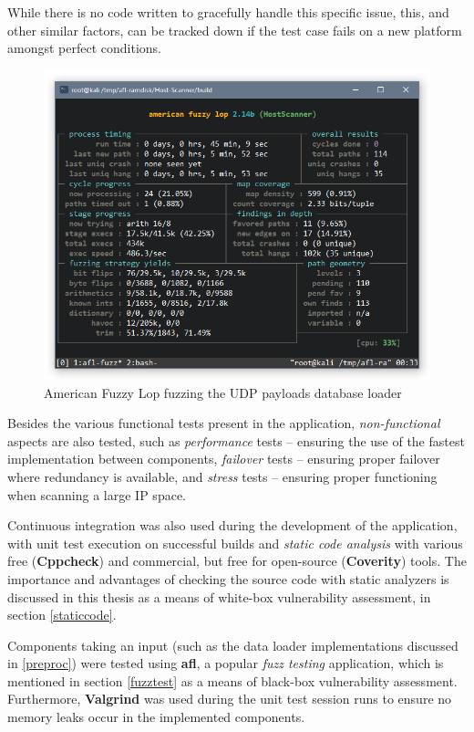 \documentclass[a4paper,12pt]{article}
\begin{document}
	While there is no code written to gracefully handle this specific issue, this, and other similar factors, can be tracked down if the test case fails on a new platform amongst perfect conditions.
	
	\begin{figure}[H]
		\centering
		\includegraphics[scale=0.825]{fuzzing.png}
		\caption{American Fuzzy Lop fuzzing the UDP payloads database loader}
		\label{aflsrc}
	\end{figure}
	
	Besides the various functional tests present in the application, \textit{non-functional} aspects are also tested, such as \textit{performance} tests -- ensuring the use of the fastest implementation between components, \textit{failover} tests -- ensuring proper failover where redundancy is available, and \textit{stress} tests -- ensuring proper functioning when scanning a large IP space.
	
	Continuous integration was also used during the development of the application, with unit test execution on successful builds and \textit{static code analysis} with various free (\textbf{Cppcheck}) and commercial, but free for open-source (\textbf{Coverity}) tools. The importance and advantages of checking the source code with static analyzers is discussed in this thesis as a means of white-box vulnerability assessment, in section \ref{staticcode}.
	
	Components taking an input (such as the data loader implementations discussed in \ref{preproc}) were tested using \textbf{afl}\cite{mzalewski15}, a popular \textit{fuzz testing} application, which is mentioned in section \ref{fuzztest} as a means of black-box vulnerability assessment. Furthermore, \textbf{Valgrind} was used during the unit test session runs to ensure no memory leaks occur in the implemented components.
\end{document}
